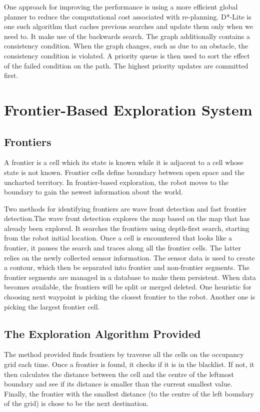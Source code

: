 \documentclass{article}
\begin{document}
One approach for improving the performance is using a more efficient global planner to reduce the computational cost associated with re-planning. D*-Lite is one such algorithm that caches previous searches and update them only when we need to. It make use of the backwards search. The graph additionally contains a consistency condition. When the graph changes, such as due to an obstacle, the consistency condition is violated. A priority queue is then used to sort the effect of the failed condition on the path. The highest priority updates are committed first.


\section{Frontier-Based Exploration System}
\subsection {Frontiers}

A frontier is a cell which its state is known while it is adjacent to a cell whose state is not known. Frontier cells define boundary between open space and the uncharted territory. In frontier-based exploration, the robot moves to the boundary to gain the newest information about the world.

Two methods for identifying frontiers are wave front detection and fast frontier detection.The wave front detection explores the map based on the map that has already been explored. It searches the frontiers using depth-first search, starting from the robot initial location. Once a cell is encountered that looks like a frontier, it pauses the search and traces along all the frontier cells. The latter relies on the newly collected sensor information. The sensor data is used to create a contour, which then be separated into frontier and non-frontier segments. The frontier segments are managed in a database to make them persistent. When data becomes available, the frontiers will be split or merged deleted. One heuristic for choosing next waypoint is picking the closest frontier to the robot. Another one is picking the largest frontier cell.

\subsection {The Exploration Algorithm Provided}
The method provided finds frontiers by traverse all the cells on the occupancy grid each time. Once a frontier is found, it checks if it is in the blacklist. If not, it then calculates the distance between the cell and the centre of the leftmost boundary and see if its distance is smaller than the current smallest value.  Finally, the frontier with the smallest distance (to the centre of the left boundary of the grid) is chose to be the next destination.  
\end{document}
